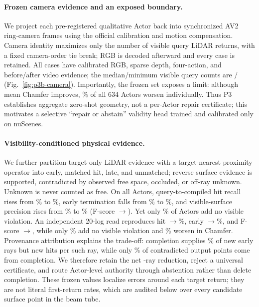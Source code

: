 

\paragraph{Frozen camera evidence and an exposed boundary.}
We project each pre-registered qualitative Actor back into synchronized AV2 ring-camera frames using the official calibration
and motion compensation. Camera identity maximizes only the number of visible query LiDAR returns, with a fixed camera-order
tie break; RGB is decoded afterward and every case is retained. All \PthreeBCases{} cases have calibrated RGB, sparse depth,
four-action, and before/after video evidence; the median/minimum visible query counts are
\PthreeBMedianVisible{}/\PthreeBMinimumVisible{} (Fig.~\ref{fig:p3b-camera}). Importantly, the frozen set exposes a limit:
although mean Chamfer improves, \PthreeActorWorse{}\% of all 634 Actors worsen individually. Thus P3 establishes aggregate
zero-shot geometry, not a per-Actor repair certificate; this motivates a selective ``repair or abstain'' validity head trained
and calibrated only on nuScenes.

\paragraph{Visibility-conditioned physical evidence.}
We further partition target-only LiDAR evidence with a target-nearest proximity operator into early, matched hit, late, and unmatched; reverse
surface evidence is supported, contradicted by observed free space, occluded, or off-ray unknown. Unknown is never counted as
free. On all \PthreeCActors{} Actors, query-to-compiled hit recall rises from \PthreeCQueryHit{}\% to
\PthreeCCompiledHit{}\%, early termination falls from \PthreeCQueryEarly{}\% to \PthreeCCompiledEarly{}\%, and visible-surface
precision rises from \PthreeCQueryPrecision{}\% to \PthreeCCompiledPrecision{}\% (F-score
\PthreeCQueryFscore{}$\rightarrow$\PthreeCCompiledFscore{}). Yet only \PthreeCNonnewActors{}\% of Actors add no visible
violation. An independent 20-log read reproduces hit
\PthreeFreshQueryHit{}$\rightarrow$\PthreeFreshCompiledHit{}\%, early
\PthreeFreshQueryEarly{}$\rightarrow$\PthreeFreshCompiledEarly{}\%, and F-score
\PthreeFreshQueryFscore{}$\rightarrow$\PthreeFreshCompiledFscore{}, while only \PthreeFreshNonnewActors{}\% add no visible
violation and \PthreeFreshChamferWorse{}\% worsen in Chamfer. Provenance attribution explains the trade-off: completion supplies \PthreeDCompletionNewEarly{}\% of new early rays
but \PthreeDCompletionGain{} new hits per such ray, while only \PthreeDCompletionContradiction{}\% of contradicted output points
come from completion. We therefore retain the net \PthreeDNetEarlyReduction{}-ray reduction, reject a universal certificate,
and route Actor-level authority through abstention rather than delete completion. These frozen values localize errors around each
target return; they are not literal first-return rates, which are audited below over every candidate surface point in the beam tube.

